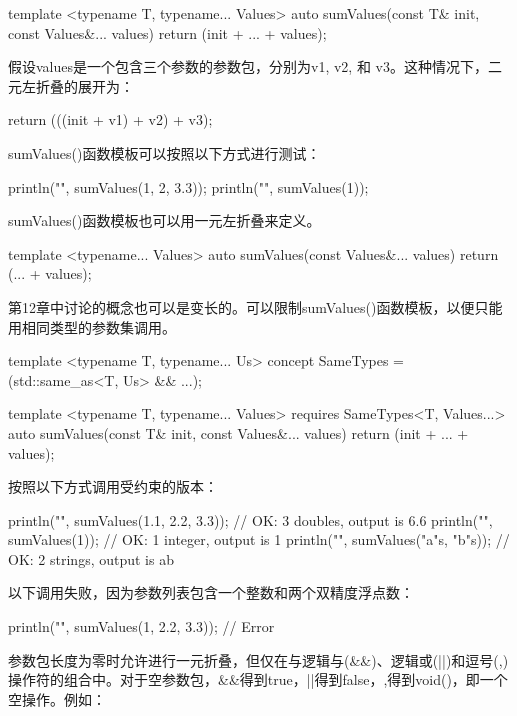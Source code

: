\begin{cpp}
template <typename T, typename... Values>
auto sumValues(const T& init, const Values&... values)
{ return (init + ... + values);}
\end{cpp}

假设values是一个包含三个参数的参数包，分别为v1, v2, 和 v3。这种情况下，二元左折叠的展开为：

\begin{cpp}
return (((init + v1) + v2) + v3);
\end{cpp}

sumValues()函数模板可以按照以下方式进行测试：

\begin{cpp}
println("{}", sumValues(1, 2, 3.3));
println("{}", sumValues(1));
\end{cpp}

sumValues()函数模板也可以用一元左折叠来定义。

\begin{cpp}
template <typename... Values>
auto sumValues(const Values&... values) { return (... + values); }
\end{cpp}

第12章中讨论的概念也可以是变长的。可以限制sumValues()函数模板，以便只能用相同类型的参数集调用。

\begin{cpp}
template <typename T, typename... Us>
concept SameTypes = (std::same_as<T, Us> && ...);

template <typename T, typename... Values>
    requires SameTypes<T, Values...>
auto sumValues(const T& init, const Values&... values)
{ return (init + ... + values); }
\end{cpp}

按照以下方式调用受约束的版本：

\begin{cpp}
println("{}", sumValues(1.1, 2.2, 3.3)); // OK: 3 doubles, output is 6.6
println("{}", sumValues(1)); // OK: 1 integer, output is 1
println("{}", sumValues("a"s, "b"s)); // OK: 2 strings, output is ab
\end{cpp}

以下调用失败，因为参数列表包含一个整数和两个双精度浮点数：

\begin{cpp}
println("{}", sumValues(1, 2.2, 3.3)); // Error
\end{cpp}

参数包长度为零时允许进行一元折叠，但仅在与逻辑与(\&\&)、逻辑或(||)和逗号(,)操作符的组合中。对于空参数包，\&\&得到true，||得到false，,得到void()，即一个空操作。例如：

